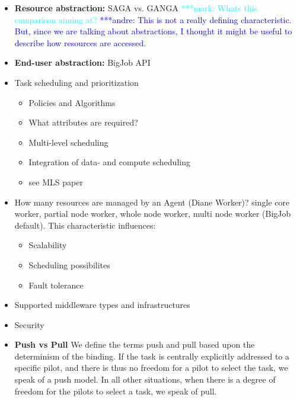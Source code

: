 \documentclass[]{article}
\newcommand{\alnote}[1]{ {\textcolor{blue} { ***andre: #1 }}}
\newcommand{\msnote}[1]{ {\textcolor{cyan} { ***mark: #1 }}}
\newcommand{\alnote}[1]{}
\begin{document}
\begin{itemize}
	\item \textbf{Resource abstraction:} SAGA vs. GANGA
	\msnote{Whats this comparison aiming at?} \alnote{This is not a really 
	defining characteristic. But, since we are talking about abstractions, I 
	thought it might be useful to describe how resources are accessed.}
	\item \textbf{End-user abstraction:} BigJob API
	\item Task scheduling and prioritization
	\begin{itemize}
	 			\item Policies and Algorithms
	 			\item What attributes are required?
	 			\item Multi-level scheduling
	 			\item Integration of data- and compute scheduling
	 			\item see MLS paper
	\end{itemize}
	\item How many resources are managed by an Agent (Diane Worker)? single core
worker, partial node worker, whole node worker, multi node worker (BigJob
default). This characteristic influences: 
    \begin{itemize}
        \item Scalability
        \item Scheduling possibilites
        \item Fault tolerance
    \end{itemize}
	\item Supported middleware types and infrastructures	
	\item Security
	\item \textbf{Push vs Pull} We define the terms push and pull based upon the determinism of the binding. If the task is centrally explicitly addressed to a specific pilot, and there is thus no freedom for a pilot to select the task, we speak of a push model. In all other situations, when there is a degree of freedom for the pilots to select a task, we speak of pull.
\end{itemize}
\end{document}
